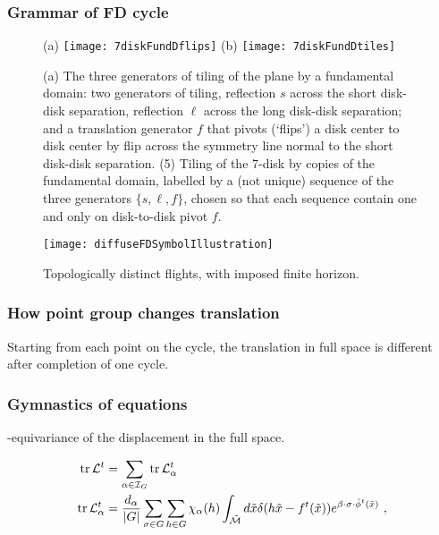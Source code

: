 \documentclass[aps,pre,preprint,groupedaddress, floatfix]{revtex4-1}
\begin{document}
\subsubsection{Grammar of FD cycle}
\begin{figure}
\begin{center}
(a) \texttt{[image: 7diskFundDflips]}
(b) \texttt{[image: 7diskFundDtiles]}
\end{center}
\caption{\label{fig:7diskFundDflips}
(a) The three generators of tiling of the plane by a fundamental domain:
two generators of  tiling, reflection $s$ across the short
disk-disk separation, reflection  $\ell$  across the long disk-disk
separation;
and
a translation generator $f$ that pivots (`flips') a disk center to disk
center by flip across the symmetry line normal to the short disk-disk
separation.
(5) Tiling of the 7-disk by copies of the fundamental domain, labelled
by a (not unique) sequence of the three generators
$\{s,\ell,f\}$, chosen so that each sequence contain one and only on
    disk-to-disk pivot $f$.
}
\end{figure}

\begin{figure}[htbp]
\texttt{[image: diffuseFDSymbolIllustration]}
\caption{\label{fig:fdflights}
Topologically distinct flights, with imposed finite horizon.
}
\end{figure}

\subsubsection{How point group changes translation}
Starting from each point on the cycle, the translation in full space is
different after completion of one cycle.


\subsubsection{Gymnastics of equations}

\Group-equivariance of the displacement in the full space.

\begin{align}
\mbox{\rm tr}\,{\cal L}^t &=
\sum_{\alpha \in{\cal I}_G} \mbox{\rm tr}\,{\cal L}_{\alpha}^t\nonumber\\
\mbox{\rm tr}\,{\cal L}_{\alpha}^t &=
\frac{d_\alpha}{|G|}\sum_{\sigma \in G}\sum_{h\in G}\chi_\alpha(h)
\int_{\tilde {\cal M}} d\tilde x \delta (h\tilde x - f^t(\tilde x))
e^{\beta\cdot\sigma\cdot\hat \phi^t(\tilde x)}~,
\label{e1}
\end{align}
\end{document}
